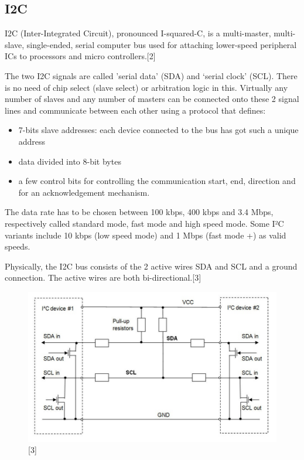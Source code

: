 \documentclass[11pt,a4paper]{article}
\begin{document}
	\subsection{I2C}
	I2C (Inter-Integrated Circuit), pronounced I-squared-C, is a multi-master, multi-slave, single-ended, serial computer bus used for attaching lower-speed peripheral ICs to processors and micro controllers.[2]
	
	The two I2C signals are called 'serial data’ (SDA) and ‘serial clock’ (SCL). There is no need of chip select (slave select) or arbitration logic in this. Virtually any number of slaves and any number of masters can be connected onto these 2 signal lines and communicate between each other using a protocol that defines:
	\begin{itemize}
			\item 7-bits slave addresses: each device connected to the bus has got such a unique address
			\item data divided into 8-bit bytes
			\item a few control bits for controlling the communication start, end, direction and for an acknowledgement mechanism.
	\end{itemize}

	The data rate has to be chosen between 100 kbps, 400 kbps and 3.4 Mbps, respectively called standard mode, fast mode and high speed mode. Some I²C variants include 10 kbps (low speed mode) and 1 Mbps (fast mode +) as valid speeds.
	
	Physically, the I2C bus consists of the 2 active wires SDA and SCL and a ground connection. The active wires are both bi-directional.[3] 
	\begin{figure}[h!]
		\includegraphics[scale=0.4]{i2c.jpg}
		\centering
		\caption{[3]}
	\end{figure} 
	
\end{document}
